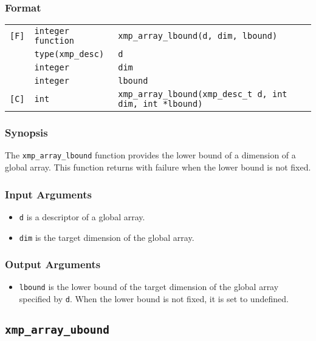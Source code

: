 \subsubsection*{Format}

\begin{tabular}{lll}

\verb![F]!& {\tt integer function}& {\tt xmp\_array\_lbound(d, dim, lbound)}\\
          & {\tt type(xmp\_desc)} & {\tt d}\\
          & {\tt integer} & {\tt dim}\\
          & {\tt integer} & {\tt lbound}\\

\verb![C]!&  {\tt int}& {\tt xmp\_array\_lbound(xmp\_desc\_t d, int dim, int *lbound)}\\

\end{tabular}

\subsubsection*{Synopsis}

The {\tt xmp\_array\_lbound} function provides the lower bound of a
dimension of a global array. This function returns with failure when the
lower bound is not fixed.

\subsubsection*{Input Arguments}
\begin{itemize}
 \item {\tt d} is a descriptor of a global array.
 \item {\tt dim} is the target dimension of the global array.
\end{itemize}

\subsubsection*{Output Arguments}
\begin{itemize}
 \item {\tt lbound} is the lower bound of the target dimension of the
       global array specified by {\tt d}. When the lower bound is not
       fixed, it is set to undefined.
\end{itemize}


\subsection{\tt xmp\_array\_ubound}

